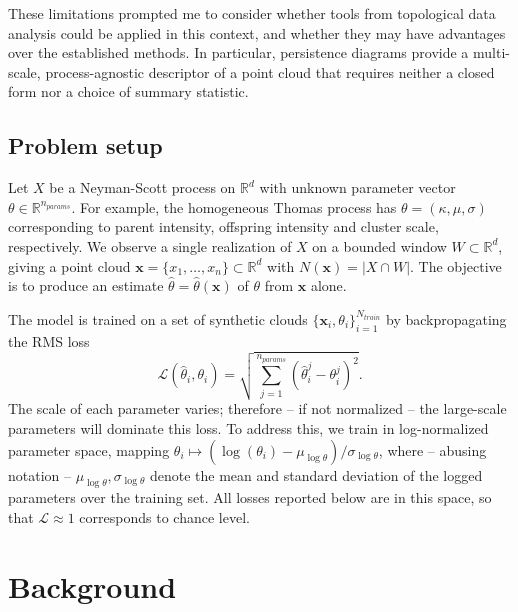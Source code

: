 \documentclass[11pt,a4paper]{article}
\newcommand{\R}{\mathbb{R}}
\newcommand{\pc}{\mathbf{x}}
\begin{document}
These limitations prompted me to consider whether tools from topological data analysis could be applied in this context, and whether they may have advantages over the established methods. In particular, persistence diagrams provide a multi-scale, process-agnostic descriptor of a point cloud that requires neither a closed form nor a choice of summary statistic.

\subsection{Problem setup}
\label{ssec:setup}

Let $X$ be a Neyman-Scott process on $\R^d$ with unknown parameter vector
$\theta \in \R^{n_{params}}$. For example, the homogeneous Thomas process has
$\theta = (\kappa, \mu, \sigma)$ corresponding to parent intensity, offspring
intensity and cluster scale, respectively. We observe a single realization of
$X$ on a bounded window $W \subset \R^d$, giving a point cloud
$\pc = \{x_1, \dots, x_n\} \subset \R^d$ with $N(\pc) = |X \cap W|$. The objective is
to produce an estimate $\hat\theta = \hat\theta(\pc)$ of $\theta$ from $\pc$
alone.

The model is trained on a set of synthetic clouds
$\{\pc_i, \theta_i\}_{i=1}^{N_{train}}$ by backpropagating the RMS loss
    \[
    \mathcal{L}(\hat\theta_i, \theta_i) = \sqrt{\sum_{j=1}^{n_{params}}(\hat\theta^j_i - \theta^j_i)^2}.
    \]
The scale of each parameter varies; therefore -- if not normalized -- the
large-scale parameters will dominate this loss. To address this, we train in
log-normalized parameter space, mapping
$\theta_i \mapsto (\log(\theta_i) - \mu_{\log\theta})/\sigma_{\log\theta}$,
where -- abusing notation -- $\mu_{\log\theta}, \sigma_{\log\theta}$ denote the
mean and standard deviation of the logged parameters over the training set. All
losses reported below are in this space, so that $\mathcal{L}\approx 1$
corresponds to chance level.

\newpage

\section{Background}
\label{sec:background}
\end{document}
